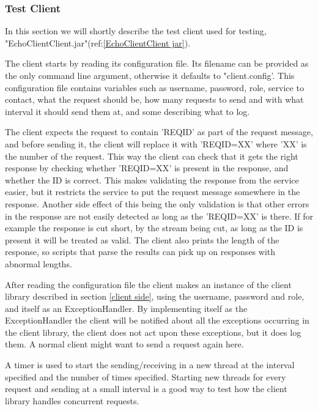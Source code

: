\subsubsection{Test Client}\label{Testing:About:Client}
    In this section we will shortly describe the test client used for testing, "EchoClientClient.jar"(ref:\ref{EchoClientClient jar}).

    The client starts by reading its configuration file. Its filename can be provided as the only command line argument, otherwise it defaults to "client.config'. This configuration file contains variables such as username, password, role, service to contact, what the request should be, how many requests to send and with what interval it should send them at, and some describing what to log.

    The client expects the request to contain '{REQID}' as part of the request message, and before sending it, the client will replace it with '{REQID=XX}' where 'XX' is the number of the request. This way the client can check that it gets the right response by checking whether '{REQID=XX}' is present in the response, and whether the ID is correct. This makes validating the response from the service easier, but it restricts the service to put the request message somewhere in the response. Another side effect of this being the only validation is that other errors in the response are not easily detected as long as the '{REQID=XX}' is there. If for example the response is cut short, by the stream being cut, as long as the ID is present it will be treated as valid. The client also prints the length of the response, so scripts that parse the results can pick up on responses with abnormal lengths.

    After reading the configuration file the client makes an instance of the client library described in section \ref{client side}, using the username, password and role, and itself as an ExceptionHandler. By implementing itself as the ExceptionHandler the client will be notified about all the exceptions occurring in the client library, the client does not act upon these exceptions, but it does log them. A normal client might want to send a request again here.
    
    A timer is used to start the sending/receiving in a new thread at the interval specified and the number of times specified. Starting new threads for every request and sending at a small interval is a good way to test how the client library handles concurrent requests.


